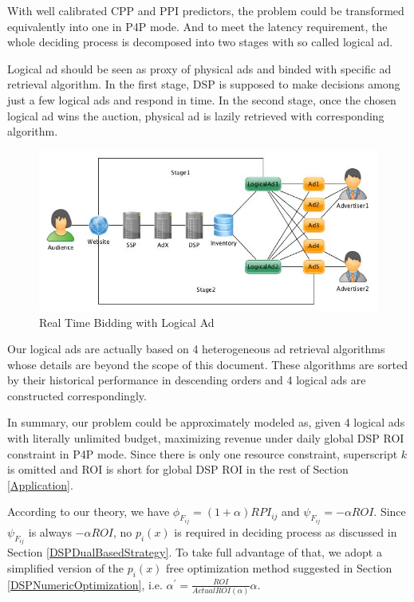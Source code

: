 \documentclass{article}
\newcommand{\sCPI}{RPI_{ij}}
\newcommand{\sF}{F_{ij}}
\newcommand{\pprob}{\phi}
\newcommand{\pcost}{\psi}
\newcommand{\dbiter}{\alpha^{'} = \frac{ROI}{ActualROI(\alpha)}\alpha}
\begin{document}
With well calibrated CPP and PPI predictors, the problem could be transformed equivalently into one in P4P mode.
And to meet the latency requirement, the whole deciding process is decomposed into two stages with so called logical ad.

Logical ad should be seen as proxy of physical ads and binded with specific ad retrieval algorithm.
In the first stage, DSP is supposed to make decisions among just a few logical ads and respond in time.
In the second stage, once the chosen logical ad wins the auction, physical ad is lazily retrieved with corresponding algorithm.

\begin{figure}[!h]
\centering
\includegraphics[width=1.0\linewidth]{./LogicalAd.jpg}
\caption{Real Time Bidding with Logical Ad}
\end{figure}

Our logical ads are actually based on 4 heterogeneous ad retrieval algorithms whose details are beyond the scope of this document.
These algorithms are sorted by their historical performance in descending orders and 4 logical ads are constructed correspondingly.

In summary, our problem could be approximately modeled as, given 4 logical ads with literally unlimited budget,
    maximizing revenue under daily global DSP ROI constraint in P4P mode.
Since there is only one resource constraint, superscript $k$ is omitted and
    ROI is short for global DSP ROI in the rest of Section \ref{Application}.

According to our theory, we have $\pprob_{\sF}=(1+\alpha)\sCPI$ and $\pcost_{\sF}=-\alpha{}ROI$.
Since $\pcost_{\sF}$ is always $-\alpha{}ROI$, no $p_i(x)$ is required in deciding process as discussed in Section \ref{DSPDualBasedStrategy}.
To take full advantage of that, we adopt a simplified version of the $p_i(x)$ free optimization method
    suggested in Section \ref{DSPNumericOptimization}, i.e. $\dbiter$.
\end{document}
